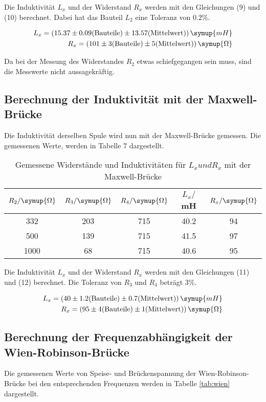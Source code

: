 Die Induktivität $L_{x}$ und der Widerstand $R_{x}$ werden mit den Gleichungen (9) und (10) berechnet. Dabei hat
das Bauteil $L_2$ eine Toleranz von $0.2\%$.

\begin{align*}
  L_{x} = (15.37 \pm 0.09\text{(Bauteile)} \pm 13.57\text{(Mittelwert)}) \, \symup{mH} \\
  R_x = (101 \pm 3\text{(Bauteile)} \pm 5\text{(Mittelwert)}) \, \symup{\Omega}
\end{align*}

Da bei der Messung des Widerstandes $R_2$ etwas schiefgegangen sein muss, sind die Messwerte nicht aussagekräftig.


\subsection{Berechnung der Induktivität mit der Maxwell-Brücke}
Die Induktivität derselben Spule wird nun mit der Maxwell-Brücke gemessen. Die gemessenen Werte, werden in Tabelle 7
dargestellt.

\begin{table}[H]
  \centering
  \caption{Gemessene Widerstände und Induktivitäten für $L_{x} und R_{x}$ mit der Maxwell-Brücke}
  \label{tab:Widerstand}
  \begin{tabular}{c c c c c}
    \toprule
     $R_2/ \symup{\Omega}$ & $R_3/ \symup{\Omega}$ & $R_4 / \symup{\Omega}$ & $L_x/$mH & $R_x/\symup{\Omega}$\\
    \midrule
    332 & 203 & 715 & 40.2 & 94 \\
    500 & 139 & 715 & 41.5 & 97 \\
   1000 &  68 & 715 & 40.6 & 95 \\
    \bottomrule
  \end{tabular}
\end{table}

Die Induktivität $L_{x}$ und der Widerstand $R_{x}$ werden mit den Gleichungen (11) und (12) berechnet. Die
Toleranz von $R_3$ und $R_4$ beträgt $3\%$.

\begin{align*}
  L_x = (40 \pm 1.2\text{(Bauteile)} \pm 0.7 \text{(Mittelwert)})  \, \symup{mH} \\
  R_x = (95 \pm 4\text{(Bauteile)} \pm 1\text{(Mittelwert)})   \, \symup{\Omega}
\end{align*}




\subsection{Berechnung der Frequenzabhängigkeit der Wien-Robinson-Brücke}
Die gemessenen Werte von Speise- und Brückenspannung der Wien-Robinson-Brücke bei
den entsprechenden Frequenzen werden in Tabelle \ref{tab:wien} dargestellt.

